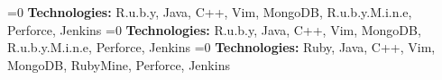 
    \ifnum{}=0
        \hspace{1.0em}
        {\textbf{Technologies:} R.u.b.y, Java, C++, Vim, MongoDB, R.u.b.y.M.i.n.e, Perforce, Jenkins}
    \fi
    \ifnum{}=0
        \hspace{1.0em}
        {\textbf{Technologies:} R.u.b.y, Java, C++, Vim, MongoDB, R.u.b.y.M.i.n.e, Perforce, Jenkins}
    \fi
    \ifnum{}=0
        \hspace{1.0em}
        {\textbf{Technologies:} Ruby, Java, C++, Vim, MongoDB, RubyMine, Perforce, Jenkins}
    \fi
